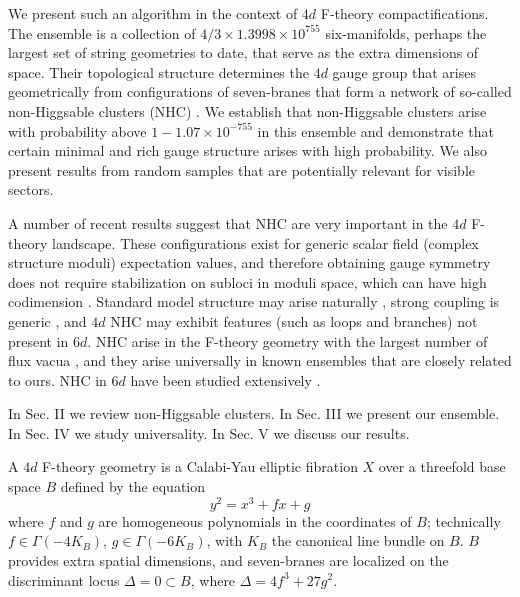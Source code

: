 \documentclass[aps,prl,twocolumn, superscriptaddress,groupedaddress,nofootinbib]{revtex4-1}
\begin{document}
We present such an algorithm in the context of $4d$ F-theory \cite{Vafa:1996xn,*Morrison:1996pp,*Morrison:1996pp}
compactifications. The ensemble is a collection of
$4/3\times 1.3998\times 10^{755}$ six-manifolds, perhaps the largest set
of string geometries to date, that serve as the extra dimensions of space. Their topological structure determines the $4d$ gauge group that arises 
geometrically from
configurations of seven-branes that form a network of so-called non-Higgsable
clusters (NHC) \cite{Morrison:2012np}. We establish that non-Higgsable clusters arise with
probability above $1-1.07\times 10^{-755}$ in this ensemble and demonstrate that 
certain minimal and rich gauge structure arises with high probability. We also
present results from random samples that are potentially relevant for
visible sectors.

A number of recent results suggest that NHC are very
important in the $4d$ F-theory landscape. These configurations exist for generic
 scalar field (complex structure moduli) expectation values, and therefore obtaining
gauge symmetry does not require \cite{Grassi:2014zxa} stabilization on subloci in 
moduli space, which can have high codimension \cite{Braun:2014xka,*Watari:2015ysa,*Halverson:2016tve}. Standard model structure may arise naturally \cite{Grassi:2014zxa}, strong coupling is generic \cite{Halverson:2016vwx}, and $4d$ NHC may exhibit features \cite{Morrison:2014lca} (such as loops and branches) not present
in $6d$. NHC arise in the F-theory geometry with the largest number of flux
vacua \cite{Taylor:2015xtz}, and they arise universally in known ensembles 
\cite{Halverson:2015jua,*Taylor:2015ppa} that are closely related to ours.
NHC in $6d$ have been studied extensively \cite{Morrison:2012np,Morrison:2012js,*Taylor:2012dr,*Morrison:2014era,*Martini:2014iza,*Johnson:2014xpa,*Taylor:2015isa}.

In Sec. II we review non-Higgsable clusters. In Sec. III we present our ensemble.
In Sec. IV we study universality. In Sec. V we discuss our results.


\vspace{.2cm}
A $4d$ F-theory geometry is a Calabi-Yau elliptic fibration
$X$ over a threefold base space $B$ defined by the equation
\begin{equation}
y^2=x^3+f x + g
\end{equation}
where $f$ and $g$ are homogeneous polynomials in the coordinates
of $B$; technically $f\in \Gamma(-4K_B)$, $g\in \Gamma(-6K_B)$,
with $K_B$ the canonical line bundle on $B$. $B$ provides extra spatial dimensions, and seven-branes are localized on the discriminant locus
$\Delta=0\subset B$, where $\Delta = 4f^3+27g^2$.
\end{document}

